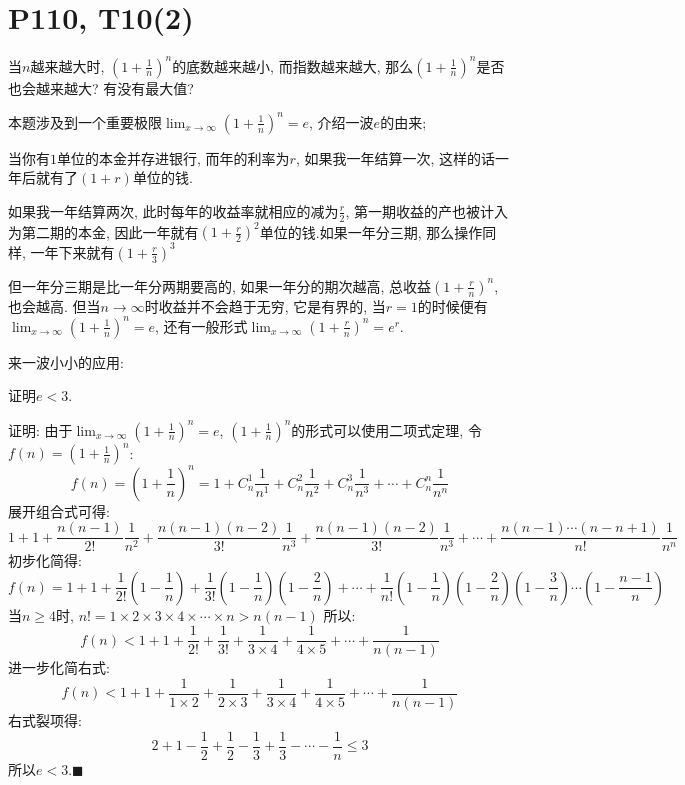 \documentclass{book}
\begin{document}
    \section{\textcolor[rgb]{0.11,0.65,0.52}{P110, T10(2)}}
    \begin{boxB}
        当$n$越来越大时, $\displaystyle (1+\frac{1}{n})^{n}$的底数越来越小, 而指数越来越大, 那么$\displaystyle (1+\frac{1}{n})^{n}$是否也会越来越大? 有没有最大值?
    \end{boxB}
    本题涉及到一个重要极限$\displaystyle \lim_{x \to \infty} (1+\frac{1}{n} )^n=e$, 介绍一波$e$的由来;

    当你有$1$单位的本金并存进银行, 而年的利率为$r$, 如果我一年结算一次, 这样的话一年后就有了$(1+r)$单位的钱.

    如果我一年结算两次, 此时每年的收益率就相应的减为$\displaystyle \frac{r}{2}$, 第一期收益的产也被计入为第二期的本金, 因此一年就有$\displaystyle (1+\frac{r}{2})^2$单位的钱.如果一年分三期, 那么操作同样, 一年下来就有$\displaystyle (1+\frac{r}{3})^3$

    但一年分三期是比一年分两期要高的, 如果一年分的期次越高, 总收益$\displaystyle (1+\frac{r}{n})^n$, 也会越高. 但当$n\to \infty$时收益并不会趋于无穷, 它是有界的, 当$r=1$的时候便有$\displaystyle \lim_{x \to \infty} (1+\frac{1}{n} )^n=e$, 还有一般形式$\displaystyle \lim_{x \to \infty} (1+\frac{r}{n} )^n=e^r$.

    来一波小小的应用:
    \begin{boxB}
        证明$e<3$.
    \end{boxB}
    证明: 由于$\displaystyle \lim_{x \to \infty} (1+\frac{1}{n} )^n=e$, $\displaystyle (1+\frac{1}{n} )^n$的形式可以使用二项式定理, 令$\displaystyle f(n)=(1+\frac{1}{n} )^n$:
    $$
        f(n)=(1+\frac{1}{n})^n=1+C_n^1\frac{1}{n^1}+C_n^2\frac{1}{n^2}+C_n^3\frac{1}{n^3}+\cdots +C_n^n\frac{1}{n^n}
    $$
    展开组合式可得:
    $$
        1+1+\frac{n(n-1)}{2!}\frac{1}{n^2}+\frac{n(n-1)(n-2)}{3!}\frac{1}{n^3}+\frac{n(n-1)(n-2)}{3!}\frac{1}{n^3}+\cdots +\frac{n(n-1)\cdots (n-n+1)}{n!}\frac{1}{n^n}
    $$
    初步化简得:
    $$
        f(n)=1+1+\frac{1}{2!}(1-\frac{1}{n})+\frac{1}{3!}(1-\frac{1}{n})(1-\frac{2}{n})+\cdots +\frac{1}{n!}(1-\frac{1}{n})(1-\frac{2}{n})(1-\frac{3}{n})\cdots (1-\frac{n-1}{n})
    $$
    当$n\geqslant 4$时, $n!=1\times2\times3\times4\times\cdots \times n>n(n-1)$
    所以:
    $$
        f(n)<1+1+\frac{1}{2!}+\frac{1}{3!}+\frac{1}{3\times4}+\frac{1}{4\times5}+\cdots +\frac{1}{n(n-1)}
    $$
    进一步化简右式:
    $$
        f(n)<1+1+\frac{1}{1\times2}+\frac{1}{2\times3}+\frac{1}{3\times4}+\frac{1}{4\times5}+\cdots+\frac{1}{n(n-1)}
    $$
    右式裂项得:
    $$
        2+1-\frac{1}{2}+\frac{1}{2}-\frac{1}{3}+\frac{1}{3}-\cdots-\frac{1}{n} \leqslant 3
    $$
    所以$e<3$.$\blacksquare$
\end{document}
